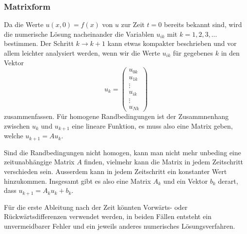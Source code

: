 \subsubsection{Matrixform}
Da die Werte $u(x,0)=f(x)$ von $u$ zur Zeit $t=0$ bereits bekannt
sind, wird die numerische Lösung nacheinander die Variablen
$u_{ik}$ mit $k=1,2,3,\dots$ bestimmen.
%
Der Schritt $k\to k+1$ kann etwas kompakter beschrieben und vor allem
leichter analysiert werden, wenn wir die Werte $u_{ik}$ für gegebenes $k$
in den Vektor
\[
u_k = \begin{pmatrix}
u_{0k}\\
u_{1k}\\
\vdots\\
u_{ik}\\
\vdots\\
u_{Nk}
\end{pmatrix}
\]
zusammenfassen.
Für homogene Randbedingungen ist der Zusammnenhang zwischen $u_k$
und $u_{k+1}$ eine lineare Funktion, es muss also eine Matrix geben,
welche $u_{k+1}=Au_k$.

Sind die Randbedingungen nicht homogen, kann man nicht mehr unbeding
eine zeitunabhängige Matrix $A$ finden, vielmehr kann die Matrix
in jedem Zeitschritt verschieden sein.
Ausserdem kann in jedem Zeitschritt ein konstanter Wert hinzukommen.
Insgesamt gibt es also eine Matrix $A_k$ und ein Vektor $b_k$ derart,
dass $u_{k+1} = A_ku_k + b_k$.
%

Für die erste Ableitung nach der Zeit könnten Vorwärts- oder
Rückwärtsdifferenzen verwendet werden, in beiden Fällen entsteht
ein unvermeidbarer Fehler und ein jeweils anderes numerisches
Lösungsverfahren.
%
%


